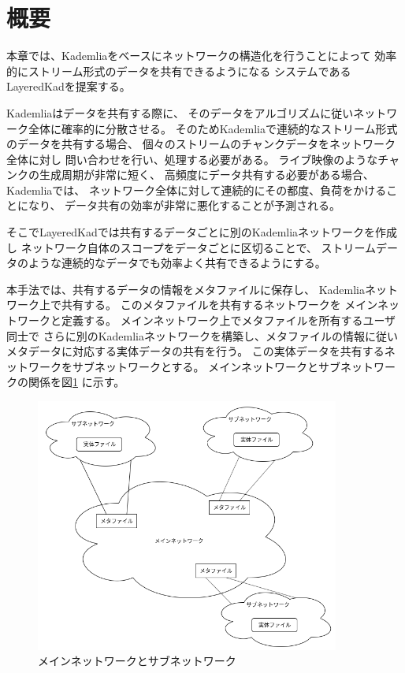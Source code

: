 \documentclass[sotsuron]{jcsie}
\begin{document}
\section{概要}
本章では、Kademliaをベースにネットワークの構造化を行うことによって
効率的にストリーム形式のデータを共有できるようになる
システムであるLayeredKadを提案する。

Kademliaはデータを共有する際に、
そのデータをアルゴリズムに従いネットワーク全体に確率的に分散させる。
そのためKademliaで連続的なストリーム形式のデータを共有する場合、
個々のストリームのチャンクデータをネットワーク全体に対し
問い合わせを行い、処理する必要がある。
ライブ映像のようなチャンクの生成周期が非常に短く、
高頻度にデータ共有する必要がある場合、Kademliaでは、
ネットワーク全体に対して連続的にその都度、負荷をかけることになり、
データ共有の効率が非常に悪化することが予測される。

そこでLayeredKadでは共有するデータごとに別のKademliaネットワークを作成し
ネットワーク自体のスコープをデータごとに区切ることで、
ストリームデータのような連続的なデータでも効率よく共有できるようにする。

本手法では、共有するデータの情報をメタファイルに保存し、
Kademliaネットワーク上で共有する。
このメタファイルを共有するネットワークを
メインネットワークと定義する。
メインネットワーク上でメタファイルを所有するユーザ同士で
さらに別のKademliaネットワークを構築し、メタファイルの情報に従い
メタデータに対応する実体データの共有を行う。
この実体データを共有するネットワークをサブネットワークとする。
メインネットワークとサブネットワークの関係を図\ref{fig:image}
に示す。

\begin{figure}[H]
	\centering
	\includegraphics[width=10cm]{./assets/image/image.png}
	\caption{メインネットワークとサブネットワーク}
	\label{fig:image}
\end{figure}
\end{document}
